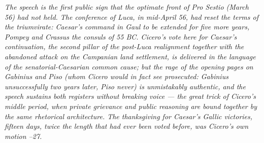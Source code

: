 \textit{The speech is the first public sign that the
optimate front of \textit{Pro Sestio} (March 56) had not
held. The conference of Luca, in mid-April 56, had reset
the terms of the triumvirate: Caesar's command in Gaul to
be extended for five more years, Pompey and Crassus the
consuls of 55 BC. Cicero's vote here for Caesar's
continuation, the second pillar of the post-Luca
realignment together with the abandoned attack on the
Campanian land settlement, is delivered in the language of
the senatorial-Caesarian common cause; but the rage of
the opening pages on Gabinius and Piso (whom Cicero would
in fact see prosecuted: Gabinius unsuccessfully two years
later, Piso never) is unmistakably authentic, and the
speech sustains both registers without breaking voice ---
the great trick of Cicero's middle period, when private
grievance and public reasoning are bound together by the
same rhetorical architecture. The thanksgiving for
Caesar's Gallic victories, fifteen days, twice the length
that had ever been voted before, was Cicero's own motion
--27.}
